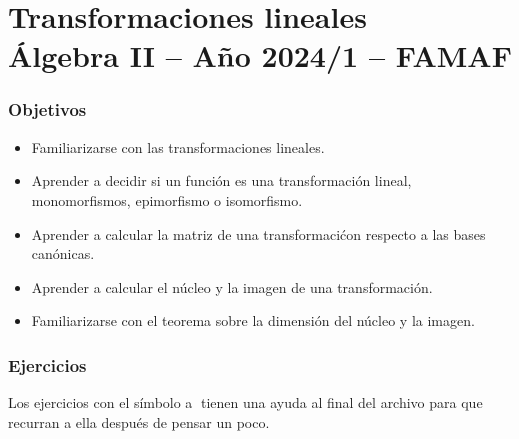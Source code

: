 \chapter{Transformaciones lineales \\ Álgebra  II -- Año 2024/1 -- FAMAF}\label{practico-7}


\subsection*{Objetivos}

\begin{itemize}
 \item Familiarizarse con las transformaciones lineales.
 \item Aprender a decidir si un función es una transformación lineal, monomorfismos, epimorfismo o isomorfismo.
 \item Aprender a calcular la matriz de una transformaci\'con respecto a las bases canónicas.
 \item Aprender a calcular el núcleo y la imagen de una transformación.

 \item Familiarizarse con el teorema sobre la dimensión del núcleo y la imagen.
\end{itemize}



\subsection*{Ejercicios} Los ejercicios con el símbolo \textcircled{a} tienen una ayuda al final del archivo para que recurran a ella después de pensar un poco.

